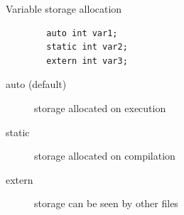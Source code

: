 \documentclass[xcolor={dvipsnames}]{beamer}
\begin{document}
\begin{frame}[fragile]{Variable storage allocation}
	\begin{verbatim}
		auto int var1;
		static int var2;
		extern int var3;
	\end{verbatim}
	\begin{description}
		\item[auto (default)] storage allocated on execution
		\item[static] storage allocated on compilation
		\item[extern] storage can be seen by other files
	\end{description}
\end{frame}
\end{document}
